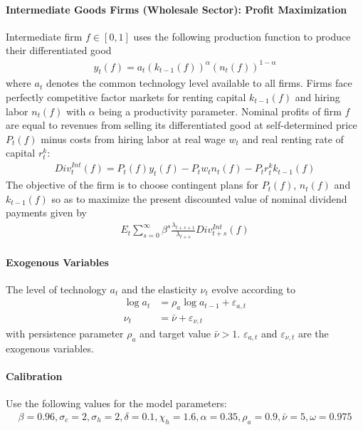 \documentclass{article}
\begin{document}
\paragraph{Intermediate Goods Firms (Wholesale Sector): Profit Maximization}
Intermediate firm $f\in[0,1]$ uses the following production function to produce their differentiated good
\begin{align}
y_t(f) = a_t (k_{t-1}(f))^\alpha (n_t(f))^{1-\alpha} \label{eq:RBCMonopIrrInv.IntermediateFirms.ProductionFunction}
\end{align}
where $a_t$ denotes the common technology level available to all firms.
Firms face perfectly competitive factor markets for renting capital $k_{t-1}(f)$ and hiring labor $n_t(f)$ with $\alpha$ being a productivity parameter.
Nominal profits of firm $f$ are equal to revenues from selling its differentiated good at self-determined price $P_t(f)$
  minus costs from hiring labor at real wage $w_t$ and real renting rate of capital $r^k_t$:
\begin{align}
{Div}^{Int}_t(f) = P_t(f) y_t(f) - P_t w_t n_t(f) - P_t r^k_t k_{t-1}(f) \label{eq:RBCMonopIrrInv.Firms.Profits}
\end{align}
The objective of the firm is to choose contingent plans for $P_t(f)$, $n_t(f)$ and $k_{t-1}(f)$
  so as to maximize the present discounted value of nominal dividend payments given by
\begin{align*}
E_t \sum_{s=0}^{\infty} \beta^s \frac{\lambda_{t+s+1}}{\lambda_{t+s}} Div^{Int}_{t+s}(f)
\end{align*}

\paragraph{Exogenous Variables}
The level of technology $a_t$ and the elasticity $\nu_t$ evolve according to
\begin{align}
\log{a_t} &= \rho_a \log{a_{t-1}} + \varepsilon_{a,t} \label{eq:RBCMonopIrrInv.LoM.TFP}\\
\nu_t &= \bar{\nu} + \varepsilon_{\nu,t} \label{eq:RBCMonopIrrInv.LoM.Elast}
\end{align}
with persistence parameter $\rho_a$ and target value $\bar{\nu}>1$.
$\varepsilon_{a,t}$ and $\varepsilon_{\nu,t}$ are the exogenous variables.

\paragraph{Calibration}
Use the following values for the model parameters:
\begin{align*}
\beta = 0.96,
\sigma_c = 2,
\sigma_h = 2,
\delta = 0.1,
\chi_h = 1.6, 
\alpha = 0.35,
\rho_a = 0.9,
\bar{\nu} = 5,
\omega = 0.975
\end{align*}
\end{document}
